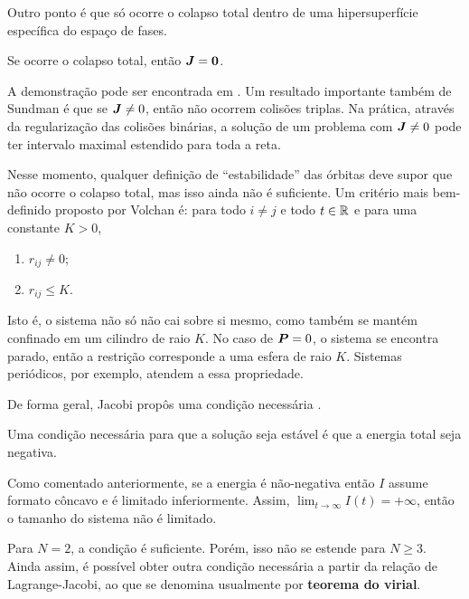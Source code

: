 Outro ponto é que só ocorre o colapso total dentro de uma hipersuperfície específica do espaço de fases.

\begin{theorem}
    Se ocorre o colapso total, então $\bm J = \bm 0$.
\end{theorem}

A demonstração pode ser encontrada em \citep[62-63]{Volchan:2007}. Um resultado importante também de Sundman é que se $\bm J \neq 0$, então não ocorrem colisões triplas. Na prática, através da regularização das colisões binárias, a solução de um problema com $\bm J \neq 0$ pode ter intervalo maximal estendido para toda a reta.

Nesse momento, qualquer definição de ``estabilidade'' das órbitas deve supor que não ocorre o colapso total, mas isso ainda não é suficiente. Um critério mais bem-definido proposto por Volchan é: para todo $i \neq j$ e todo $t \in \mathbb{R}$ e para uma constante $K > 0$,
\begin{enumerate}
    \item $r_{ij} \neq 0$;
    \item $r_{ij} \leq K$.
\end{enumerate}
Isto é, o sistema não só não cai sobre si mesmo, como também se mantém confinado em um cilindro de raio $K$. No caso de $\bm P = 0$, o sistema se encontra parado, então a restrição corresponde a uma esfera de raio $K$. Sistemas periódicos, por exemplo, atendem a essa propriedade.

De forma geral, Jacobi propôs uma condição necessária \citep[65]{Volchan:2007}.

\begin{theorem}
    Uma condição necessária para que a solução seja estável é que a energia total seja negativa.
\end{theorem}
\begin{Proof}
    Como comentado anteriormente, se a energia é não-negativa então $I$ assume formato côncavo e é limitado inferiormente. Assim, $\lim_{t \to \infty} I(t) = +\infty$, então o tamanho do sistema não é limitado.
\end{Proof}

Para $N=2$, a condição é suficiente. Porém, isso não se estende para $N \geq 3$. Ainda assim, é possível obter outra condição necessária a partir da relação de Lagrange-Jacobi, ao que se denomina usualmente por \textbf{teorema do virial}.


